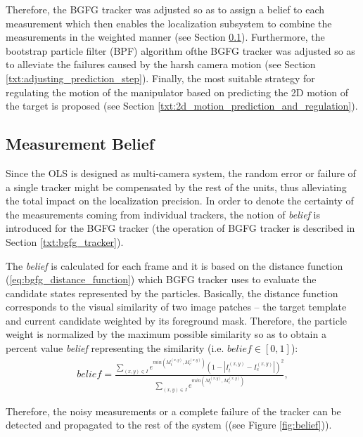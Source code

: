 Therefore, the BGFG tracker was adjusted so as to assign a belief to each measurement which then enables the localization subsystem to combine the measurements in the weighted manner (see Section \ref{txt:measurement_belief}). Furthermore, the bootstrap particle filter (BPF) algorithm ofthe BGFG tracker was adjusted so as to alleviate the failures caused by the harsh camera motion (see Section \ref{txt:adjusting_prediction_step}). Finally, the most suitable strategy for regulating the motion of the manipulator based on predicting the 2D motion of the target is proposed (see Section \ref{txt:2d_motion_prediction_and_regulation}).

\subsection{Measurement Belief} \label{txt:measurement_belief}

Since the OLS is designed as multi-camera system, the random error or failure of a single tracker might be compensated by the rest of the units, thus alleviating the total impact on the localization precision. In order to denote the certainty of the measurements coming from individual trackers, the notion of \textit{belief} is introduced for the BGFG tracker (the operation of BGFG tracker is described in Section \ref{txt:bgfg_tracker}).

The \textit{belief} is calculated for each frame and it is based on the distance function (\ref{eq:bgfg_distance_function}) which BGFG tracker uses to evaluate the candidate states represented by the particles. Basically, the distance function corresponds to the visual similarity of two image patches -- the target template and current candidate weighted by its foreground mask. Therefore, the particle weight is normalized by the maximum possible similarity so as to obtain a percent value \textit{belief} representing the similarity (i.e. $\textit{belief} \in [0, 1]$):
\begin{align}
	belief = \frac{\sum_{(x,y) \in I}{e^{min(M_{t}^{(x,y)}, M_{c}^{(x,y)})}(1 - |I_{t}^{(x,y)} - I_{c}^{(x,y)}|)^{2}}}{\sum_{(x,y) \in I}{e^{min(M_{t}^{(x,y)}, M_{c}^{(x,y)})}}},
\end{align}

Therefore, the noisy measurements or a complete failure of the tracker can be detected and propagated to the rest of the system ((see Figure \ref{fig:belief})).

